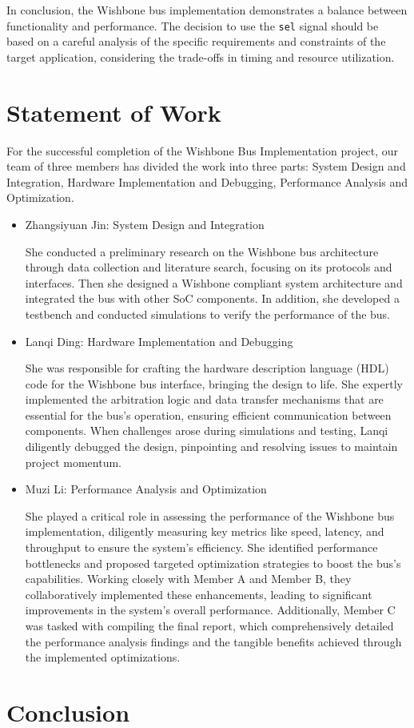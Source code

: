 \documentclass[conference]{IEEEtran}
\begin{document}
In conclusion, the Wishbone bus implementation demonstrates a balance between functionality and performance. The decision to use the \texttt{sel} signal should be based on a careful analysis of the specific requirements and constraints of the target application, considering the trade-offs in timing and resource utilization.





\section{Statement of Work}
For the successful completion of the Wishbone Bus Implementation project, our team of three members has divided the work into three parts: System Design and Integration, Hardware Implementation and Debugging, Performance Analysis and Optimization.

\begin{itemize}
    \item Zhangsiyuan Jin: System Design and Integration

    She conducted a preliminary research on the Wishbone bus architecture through data collection and literature search, focusing on its protocols and interfaces. Then she designed a Wishbone compliant system architecture and integrated the bus with other SoC components. In addition, she developed a testbench and conducted simulations to verify the performance of the bus.

    \item Lanqi Ding: Hardware Implementation and Debugging

    She was responsible for crafting the hardware description language (HDL) code for the Wishbone bus interface, bringing the design to life. She expertly implemented the arbitration logic and data transfer mechanisms that are essential for the bus's operation, ensuring efficient communication between components. When challenges arose during simulations and testing, Lanqi diligently debugged the design, pinpointing and resolving issues to maintain project momentum. 

    \item Muzi Li: Performance Analysis and Optimization

    She played a critical role in assessing the performance of the Wishbone bus implementation, diligently measuring key metrics like speed, latency, and throughput to ensure the system's efficiency. She identified performance bottlenecks and proposed targeted optimization strategies to boost the bus's capabilities. Working closely with Member A and Member B, they collaboratively implemented these enhancements, leading to significant improvements in the system's overall performance. Additionally, Member C was tasked with compiling the final report, which comprehensively detailed the performance analysis findings and the tangible benefits achieved through the implemented optimizations.

\end{itemize}


\section{Conclusion}










\printbibliography[title={References},resetnumbers=true,heading=subbibliography]
\clearpage
\end{document}
